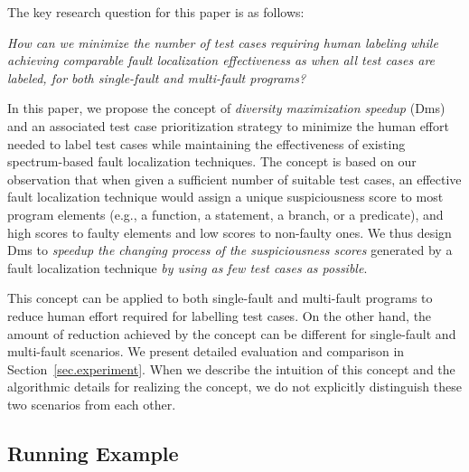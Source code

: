 The key research question for this paper is as follows:

\smallskip
\noindent {} \hangindent=0.5cm {\it How can we minimize the number of test cases requiring human labeling while achieving comparable fault localization effectiveness as when all test cases are labeled, for both single-fault and multi-fault programs?}

\smallskip
In this paper, we propose the concept of {\em diversity maximization speedup} ({\sc Dms}) and an associated test case prioritization strategy to minimize the human effort needed to label test cases while maintaining the effectiveness of existing spectrum-based fault localization techniques. The concept is based on our observation that when given a sufficient number of suitable test cases, an effective fault localization technique would assign a unique suspiciousness score to most program elements (e.g., a function, a statement, a branch, or a predicate), and high scores to faulty elements and low scores to non-faulty ones. We thus design {\sc Dms} to {\em speedup the changing process of the suspiciousness scores} generated by a fault localization technique {\em by using as few test cases as possible}.

This concept can be applied to both single-fault and multi-fault programs to reduce human effort required for labelling test cases. On the other hand, the amount of reduction achieved by the concept can be different for single-fault and multi-fault scenarios. We present detailed evaluation and comparison in Section~\ref{sec.experiment}. When we describe the intuition of this concept and the algorithmic details for realizing the concept, we do not explicitly distinguish these two scenarios from each other.

\subsection{Running Example}

